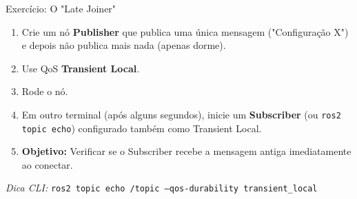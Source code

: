\begin{frame}[fragile]{Exercício: O "Late Joiner"}
  \begin{enumerate}
    \item Crie um nó \textbf{Publisher} que publica uma única mensagem ("Configuração X") e depois não publica mais nada (apenas dorme).
    \item Use QoS \textbf{Transient Local}.
    \item Rode o nó.
    \item Em outro terminal (após alguns segundos), inicie um \textbf{Subscriber} (ou \texttt{ros2 topic echo}) configurado também como Transient Local.
    \item \textbf{Objetivo:} Verificar se o Subscriber recebe a mensagem antiga imediatamente ao conectar.
  \end{enumerate}
  
  \vspace{0.5em}
  \textit{Dica CLI:}
  \texttt{ros2 topic echo /topic --qos-durability transient\_local}
\end{frame}

